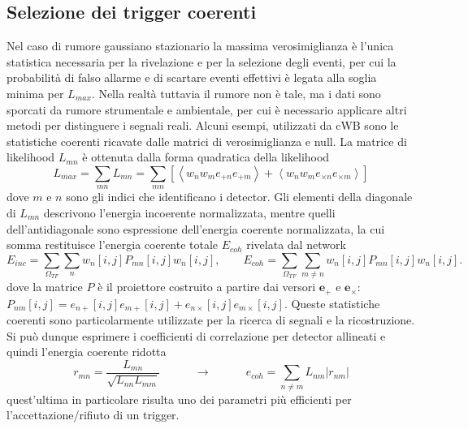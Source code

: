 \subsection{Selezione dei trigger coerenti}
Nel caso di rumore gaussiano stazionario la massima verosimiglianza è l'unica statistica necessaria per la rivelazione e per la selezione degli eventi, per cui la probabilità di falso allarme e di scartare eventi effettivi è legata alla soglia minima per $L_{max}$. Nella realtà tuttavia il rumore non è tale, ma i dati sono sporcati da rumore strumentale e ambientale, per cui è necessario applicare altri metodi per distinguere i segnali reali. Alcuni esempi, utilizzati da cWB sono le statistiche coerenti ricavate dalle matrici di verosimiglianza e null.
La matrice di likelihood $L_{mn}$ è ottenuta dalla forma quadratica della likelihood
\begin{equation}
	L_{max} = \sum_{mn}L_{mn} = \sum_{mn}\left[\left< w_nw_me_{+n}e_{+m} \right> + \left< w_nw_me_{\times n}e_{\times m} \right>\right]
	\label{eqn:likelihood_matrix}
\end{equation}
dove $m\text{ e }n$ sono gli indici che identificano i detector\cite{Klimenko_2008}. Gli elementi della diagonale di $L_{mn}$ descrivono l'energia incoerente normalizzata, mentre quelli dell'antidiagonale sono espressione dell'energia coerente normalizzata, la cui somma restituisce l'energia coerente totale $E_{coh}$ rivelata dal network
\begin{equation}
	E_{inc} = \sum_{\Omega_{TF}}\sum_{n}w_n[i,j]P_{mn}[i,j]w_n[i,j],
	\quad\quad
	E_{coh} = \sum_{\Omega_{TF}}\sum_{m\neq n}w_n[i,j]P_{mn}[i,j]w_n[i,j].
\end{equation}
dove la matrice $P$ è il proiettore costruito a partire dai versori $\mathbf{e}_+$ e $\mathbf{e}_\times$: $P_{nm}[i,j]=e_{n+}[i,j]e_{m+}[i,j]+e_{n\times}[i,j]e_{m\times}[i,j]$. 
Queste statistiche coerenti sono particolarmente utilizzate per la ricerca di segnali e la ricostruzione\cite{Klimenko_2016}.
Si può dunque esprimere i coefficienti di correlazione per detector allineati e quindi l'energia coerente ridotta
\begin{equation}
	r_{mn} = \frac{L_{mn}}{\sqrt{L_{nn}L_{mm}}} \quad\quad\quad \rightarrow \quad\quad\quad e_{coh}=\sum_{ n\neq m}L_{nm}|r_{nm}|
	\label{eqn:coherent_energy}
\end{equation}
quest'ultima in particolare risulta uno dei parametri più efficienti per l'accettazione/rifiuto di un trigger.

